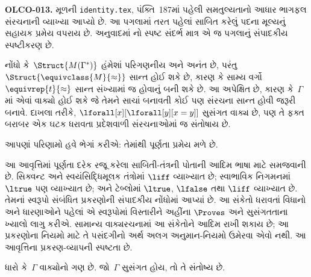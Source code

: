 \begin{editorial}
\textbf{OLCO-013.} મૂળની \texttt{identity.tex}, પંક્તિ~187માં પહેલી સમતુલ્યતાનો આધાર ભાગફલ સંરચનાની વ્યાખ્યા આપ્યો છે. આ પગલામાં તરત પહેલાં સાબિત કરેલું પદના મૂલ્યનું સહાયક પ્રમેય વપરાય છે. અનુવાદમાં નો સ્પષ્ટ સંદર્ભ માત્ર એ જ પગલાનું સંપાદકીય સ્પષ્ટીકરણ છે.
\end{editorial}

\begin{digress}
નોંધો કે~$\Struct{M(\Gamma^*)}$ હંમેશાં પરિગણનીય અને અનંત છે,
પરંતુ~$\Struct{\equivclass{M}{\approx}}$ સાન્ત હોઈ શકે છે, કારણ કે
સામ્ય વર્ગો~$\equivrep{t}{\approx}$ સાન્ત સંખ્યામાં જ હોવાનું બની શકે
છે. આ અપેક્ષિત છે, કારણ કે~$\Gamma$માં એવાં વાક્યો હોઈ શકે જે
તેમને સાચાં બનાવતી કોઈ પણ સંરચના સાન્ત હોવી જરૂરી બનાવે. દાખલા
તરીકે, $\lforall[x][\lforall[y][x=y]]$ સુસંગત વાક્ય છે, પણ તે
ફક્ત બરાબર એક ઘટક ધરાવતા પ્રદેશવાળી સંરચનાઓમાં જ
સંતોષાય છે.
\end{digress}
\endgroup


\begingroup
\makeatletter{}\makeatother


\label{guunit:OLP-0134}


\begin{explain}
આપણાં પરિણામો હવે ભેગાં કરીએ: તેમાંથી પૂર્ણતા પ્રમેય મળે છે.
\end{explain}

\begin{editorial}
આ આવૃત્તિમાં પૂર્ણતા દરેક રજૂ કરેલા સાબિતી-તંત્રની પોતાની આદિમ ભાષા
માટે સમજવાની છે. સિક્વન્ટ અને સ્વયંસિદ્ધિમૂલક તંત્રોમાં $\liff$
વ્યાખ્યાત છે; સ્વાભાવિક નિગમનમાં $\ltrue$ પણ વ્યાખ્યાત છે; અને
ટેબ્લોમાં $\ltrue$, $\lfalse$ તથા $\liff$ વ્યાખ્યાત છે.
તેમનાં સ્વરૂપો સંબંધિત પ્રકરણોની સંપાદકીય નોંધોમાં આપ્યાં છે.
આ સંકેતો ધરાવતાં વિધાનો અને ધારણાઓને પહેલાં એ સ્વરૂપોમાં વિસ્તારીને
અહીંના $\Proves$ અને સુસંગતતાના ખ્યાલો લાગુ કરીએ. સામાન્ય વાક્યરચનામાં
આ સંકેતોને આદિમ રાખી શકાય છે; આ પ્રકરણોના નિયમો માટે તે પસંદગીનો અર્થ
અલગ અનુમાન-નિયમો ઉમેરવા એવો નથી. આ આવૃત્તિના પ્રકરણ-વ્યાપની સ્પષ્ટતા છે.
\end{editorial}

\begin{thm}[પૂર્ણતા પ્રમેય]
ધારો કે~$\Gamma$ વાક્યોનો ગણ છે. જો~$\Gamma$ સુસંગત હોય, તો તે
સંતોષ્ય છે.
\end{thm}

